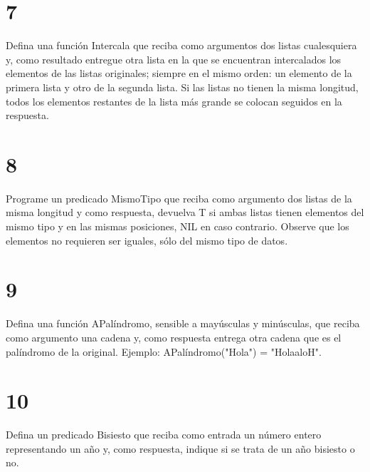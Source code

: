 \documentclass[fleqn, journal, onecolumn]{IEEEtran}             %
\theoremstyle{break}                                            %
\begin{document}
    \section{7}

        Defina una función Intercala que reciba como argumentos dos listas cualesquiera y,
        como resultado entregue otra lista en la que se encuentran intercalados los elementos de
        las listas originales; siempre en el mismo orden: un elemento de la primera lista y otro de
        la segunda lista. Si las listas no tienen la misma longitud, todos los elementos restantes
        de la lista más grande se colocan seguidos en la respuesta.
        

    \section{8}

        Programe un predicado MismoTipo que reciba como argumento dos listas de la misma
        longitud y como respuesta, devuelva T si ambas listas tienen elementos del mismo
        tipo y en las mismas posiciones, NIL en caso contrario. Observe que los elementos no
        requieren ser iguales, sólo del mismo tipo de datos.

        

    \section{9}

        Defina una función APalíndromo, sensible a mayúsculas y minúsculas, que reciba como
        argumento una cadena y, como respuesta entrega otra cadena que es el palíndromo de la
        original. Ejemplo: APalíndromo("Hola") = "HolaaloH".

        

    \section{10}

        Defina un predicado Bisiesto que reciba como entrada un número entero representando
        un año y, como respuesta, indique si se trata de un año bisiesto o no.

        
\end{document}
